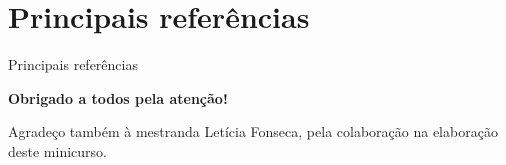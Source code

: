 \documentclass[a4paper]{beamer}
\begin{document}
%
%
%
%
%
%
%
%
%
%
%

\section{Principais referências}

\begin{frame}{Principais referências}
	


	
\end{frame}

\begin{frame}

\begin{center}
	\textbf{\Huge Obrigado a todos pela atenção!}
\end{center}

\vspace{30pt}
\begin{center}
	Agradeço também à mestranda Letícia Fonseca, pela colaboração na elaboração deste minicurso.
\end{center}

\end{frame}
\end{document}

